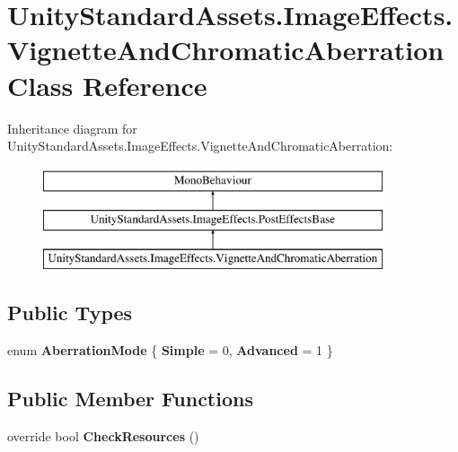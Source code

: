 \hypertarget{class_unity_standard_assets_1_1_image_effects_1_1_vignette_and_chromatic_aberration}{}\section{Unity\+Standard\+Assets.\+Image\+Effects.\+Vignette\+And\+Chromatic\+Aberration Class Reference}
\label{class_unity_standard_assets_1_1_image_effects_1_1_vignette_and_chromatic_aberration}
Inheritance diagram for Unity\+Standard\+Assets.\+Image\+Effects.\+Vignette\+And\+Chromatic\+Aberration\+:\begin{figure}[H]
\begin{center}
\leavevmode
\includegraphics[height=3.000000cm]{class_unity_standard_assets_1_1_image_effects_1_1_vignette_and_chromatic_aberration}
\end{center}
\end{figure}
\subsection*{Public Types}
\begin{DoxyCompactItemize}
\item 
enum {\bfseries Aberration\+Mode} \{ {\bfseries Simple} = 0, 
{\bfseries Advanced} = 1
 \}\hypertarget{class_unity_standard_assets_1_1_image_effects_1_1_vignette_and_chromatic_aberration_a10685d35dba29662e0f140819dbe2bf0}{}\label{class_unity_standard_assets_1_1_image_effects_1_1_vignette_and_chromatic_aberration_a10685d35dba29662e0f140819dbe2bf0}

\end{DoxyCompactItemize}
\subsection*{Public Member Functions}
\begin{DoxyCompactItemize}
\item 
override bool {\bfseries Check\+Resources} ()\hypertarget{class_unity_standard_assets_1_1_image_effects_1_1_vignette_and_chromatic_aberration_a7d939cec23cf992b53e3c17f0c730889}{}\label{class_unity_standard_assets_1_1_image_effects_1_1_vignette_and_chromatic_aberration_a7d939cec23cf992b53e3c17f0c730889}

\end{DoxyCompactItemize}
